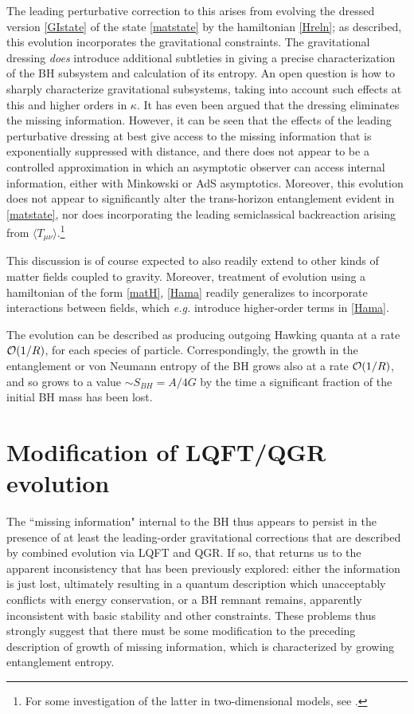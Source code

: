 \documentclass[11pt]{article}
\numberwithin{equation}{section}
\newcommand{\calo}{{\cal O}}
\begin{document}
The leading perturbative correction to this arises from evolving the dressed version \eqref{GIstate} of the state \eqref{matstate} by the hamiltonian \eqref{Hreln}; as described, this evolution incorporates the gravitational constraints.
The gravitational dressing {\it does} introduce additional subtleties in giving a precise characterization of the BH subsystem and calculation of its entropy.
An open question is how to sharply characterize gravitational subsystems\cite{DoGi4,SGsplit,SGsub}, taking into account such effects at this and higher orders in $\kappa$.  It has even been argued that the dressing eliminates the missing information\cite{CGPR,LPRS}.  However, it can be seen that the effects of the leading perturbative dressing at best give access to the missing information that is exponentially suppressed with distance\cite{SGsub}, and there does not appear to be a controlled approximation in which an asymptotic observer can access internal information, either with Minkowski or AdS asymptotics.  Moreover, this evolution does not appear to significantly alter the trans-horizon entanglement evident in \eqref{matstate}, nor does incorporating the leading semiclassical backreaction arising from $\langle T_{\mu\nu}\rangle$.\footnote{For some investigation of the latter in two-dimensional models, see \cite{GiNe}.}   

This discussion is of course expected to also readily extend to other kinds of matter fields coupled to gravity.  Moreover, treatment of evolution using a hamiltonian of the form  \eqref{matH}, \eqref{Hama} readily generalizes to incorporate interactions between fields, which {\it e.g.} introduce higher-order terms in \eqref{Hama}.    

The evolution can be  described as producing outgoing Hawking quanta at a rate $\calo(1/R)$, for each species of particle.  Correspondingly, the growth in the entanglement or von Neumann entropy of the BH grows also at a rate $\calo(1/R)$, and so grows to a value $\sim S_{BH}=A/4G$  by the time a significant fraction of the initial BH mass has been lost.


\section{Modification of  LQFT/QGR evolution}

The ``missing information" internal to the BH thus appears to persist in the presence of at least the leading-order gravitational corrections that are described by combined evolution via LQFT and QGR.  If so, that returns us to the apparent inconsistency that has been previously explored: either the information is just lost\cite{Hawk-incoh}, ultimately resulting in a quantum description which unacceptably conflicts with energy conservation\cite{BPS}, or a BH remnant remains, apparently inconsistent with basic stability\cite{CaWi,Pres,WABHIP} and other\cite{Susstrouble} constraints.  These problems thus strongly suggest that there must be some  modification to the preceding description of growth of missing information, which is characterized by growing entanglement entropy.
\end{document}
